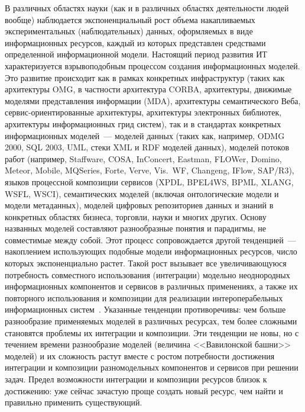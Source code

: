\begin{multicols}{2}
В различных областях науки (как и в различных областях деятельности
людей вообще) на\-блюдает\-ся экспоненциальный рост объема на\-кап\-ливаемых
экспериментальных (наблюдательных) %
данных, оформляемых в виде
информационных ресурсов, каждый из которых представлен средствами
определенной информационной модели. Настоящий период развития
ИТ характеризуется взрывоподобным
процессом создания информационных моделей. Это развитие происходит как
в рамках %
конкретных инфраструктур (таких как архитектуры OMG, в
частности архитектура CORBA, архитектуры, движимые моделями
представления информации (MDA), архитектуры семантического %
Веба, сер\-вис-ориен\-ти\-ро\-ван\-ные архитектуры, архитектуры электронных
библиотек, архитектуры информационных грид систем), так и в стандартах
конкретных информационных моделей~--- моделей %
данных (таких как,
например, ODMG 2000, SQL 2003, UML, стеки XML и RDF моделей данных),
моделей потоков работ (например, Staffware,
COSA, InConcert, Eastman, FLOWer, Domino, Meteor, Mobile, MQSeries,
Forte, Verve, Vis.~WF, Changeng, IFlow, SAP/R3), языков процессной
композиции сервисов (XPDL, BPEL4WS, BPML, XLANG, WSFL, WSCI),
семантических моделей (включая онтологические модели и модели
метаданных), моделей цифровых репозиториев данных и знаний в
конкретных областях бизнеса, торговли, науки и многих других. Основу
названных моделей составляют разнообразные понятия и парадигмы,
не совместимые между собой. Этот процесс сопровождается другой
тенденцией~--- накоплением использующих подобные модели информационных
ресурсов, число которых экспоненциально растет. Такой рост вызывает все
увеличивающуюся потребность совместного использования (интеграции)
модельно неоднородных информационных компонентов и сервисов в
различных применениях, а также их повторного использования и
композиции для реализации интероперабельных информационных систем~\cite{Ka07}.
Указанные тенденции противоречивы: чем больше разнообразие применяемых
моделей в различных ресурсах, тем более сложными становятся проблемы
их интеграции и композиции. Эти тенденции не новы, но с течением
времени разнообразие моделей (величина
<<Вавилонской башни>>
моделей) и их сложность растут вместе с ростом по\-треб\-ности достижения
интеграции и композиции разномодельных компонентов и сервисов при
решении задач. Предел возможности интеграции и композиции ресурсов
близок к достижению: уже сейчас зачастую проще создать новый ресурс,
чем найти и правильно применить существующий.


\end{multicols}

